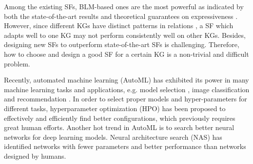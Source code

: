 \documentclass[conference]{IEEEtran}
\begin{document}
Among the existing SFs,
BLM-based ones
are the most powerful 
as indicated by both the state-of-the-art results \cite{lacroix2018canonical} and theoretical guarantees on expressiveness \cite{wang2017multi, kazemi2018simple}.
However,
since
different KGs have distinct patterns in relations \cite{paulheim2017knowledge},
a SF which adapts well to one KG may not perform consistently well on other KGs.
Besides,
designing new SFs to outperform state-of-the-art SFs 
is challenging.
Therefore,
how to choose and design a good SF for a certain KG is a non-trivial and difficult problem.

Recently,
automated machine learning (AutoML) \cite{quanming2018auto,automl_book}
has exhibited its power in
many machine learning tasks and applications,
e.g. model selection \cite{feurer2015efficient},
image classification \cite{liu2018darts,yao2019differentiable}
and recommendation \cite{yao2019efficient}.
In order to select proper models and hyper-parameters for different tasks,
hyperparameter optimization (HPO) has been proposed \cite{feurer2015efficient,falkner2018bohb}
to effectively and efficiently find better configurations,
which previously requires great human efforts.
Another hot trend in AutoML is to search better neural networks for deep learning models.
Neural architecture search (NAS) \cite{zoph2017neural} 
has identified networks with fewer parameters and better performance than networks designed by humans.
\end{document}
